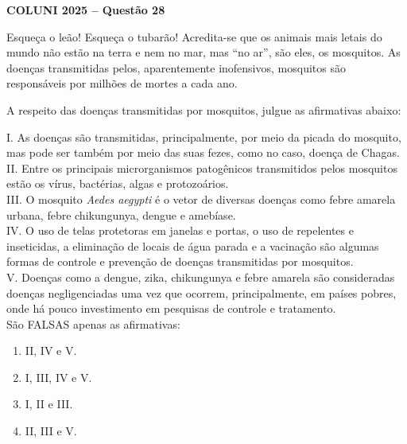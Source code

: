 \textbf{COLUNI 2025 -- Questão 28}\par\medskip Esqueça o leão! Esqueça o tubarão! Acredita-se que os animais mais letais do mundo não estão na terra e nem no mar, mas “no ar”, são eles, os mosquitos. As doenças transmitidas pelos, aparentemente inofensivos, mosquitos são responsáveis por milhões de mortes a cada ano.

A respeito das doenças transmitidas por mosquitos, julgue as afirmativas abaixo:

I. As doenças são transmitidas, principalmente, por meio da picada do mosquito, mas pode ser também por meio das suas fezes, como no caso, doença de Chagas.\\
II. Entre os principais microrganismos patogênicos transmitidos pelos mosquitos estão os vírus, bactérias, algas e protozoários.\\
III. O mosquito \textit{Aedes aegypti} é o vetor de diversas doenças como febre amarela urbana, febre chikungunya, dengue e amebíase. \\
IV. O uso de telas protetoras em janelas e portas, o uso de repelentes e inseticidas, a eliminação de locais de água parada e a vacinação são algumas formas de controle e prevenção de doenças transmitidas por mosquitos. \\
V. Doenças como a dengue, zika, chikungunya e febre amarela são consideradas doenças negligenciadas uma vez que ocorrem, principalmente, em países pobres, onde há pouco investimento em pesquisas de controle e tratamento.\\

São FALSAS apenas as afirmativas:

\begin{enumerate}
\item II, IV e V.
\item I, III, IV e V.
\item I, II e III.
\item II, III e V.
\end{enumerate}
